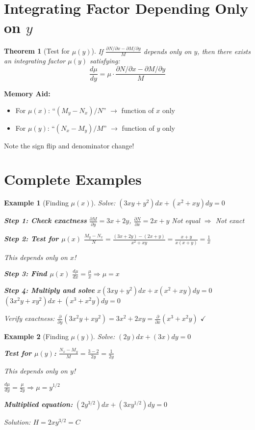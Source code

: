 \documentclass[12pt]{article}
\newtheorem{theorem}{Theorem}
\newtheorem{example}{Example}
\begin{document}
\section{Integrating Factor Depending Only on $y$}

\begin{theorem}[Test for $\mu(y)$]
If $\frac{\partial N/\partial x - \partial M/\partial y}{M}$ depends only on $y$, then there exists an integrating factor $\mu(y)$ satisfying:
$$\frac{d\mu}{dy} = \mu \cdot \frac{\partial N/\partial x - \partial M/\partial y}{M}$$
\end{theorem}

\begin{keypoint}
\textbf{Memory Aid:}
\begin{itemize}
    \item For $\mu(x)$: ``$(M_y - N_x)/N$'' $\to$ function of $x$ only
    \item For $\mu(y)$: ``$(N_x - M_y)/M$'' $\to$ function of $y$ only
\end{itemize}
Note the sign flip and denominator change!
\end{keypoint}

\section{Complete Examples}

\begin{example}[Finding $\mu(x)$]
Solve: $(3xy + y^2)dx + (x^2 + xy)dy = 0$

\textbf{Step 1: Check exactness}
$\frac{\partial M}{\partial y} = 3x + 2y$, $\frac{\partial N}{\partial x} = 2x + y$
Not equal $\Rightarrow$ Not exact

\textbf{Step 2: Test for $\mu(x)$}
$\frac{M_y - N_x}{N} = \frac{(3x + 2y) - (2x + y)}{x^2 + xy} = \frac{x + y}{x(x + y)} = \frac{1}{x}$

This depends only on $x$!

\textbf{Step 3: Find $\mu(x)$}
$\frac{d\mu}{dx} = \frac{\mu}{x} \Rightarrow \mu = x$

\textbf{Step 4: Multiply and solve}
$x(3xy + y^2)dx + x(x^2 + xy)dy = 0$
$(3x^2y + xy^2)dx + (x^3 + x^2y)dy = 0$

Verify exactness: $\frac{\partial}{\partial y}(3x^2y + xy^2) = 3x^2 + 2xy = \frac{\partial}{\partial x}(x^3 + x^2y)$ $\checkmark$
\end{example}

\begin{example}[Finding $\mu(y)$]
Solve: $(2y)dx + (3x)dy = 0$

\textbf{Test for $\mu(y)$:}
$\frac{N_x - M_y}{M} = \frac{3 - 2}{2y} = \frac{1}{2y}$

This depends only on $y$!

$\frac{d\mu}{dy} = \frac{\mu}{2y} \Rightarrow \mu = y^{1/2}$

\textbf{Multiplied equation:} $(2y^{3/2})dx + (3xy^{1/2})dy = 0$

Solution: $H = 2xy^{3/2} = C$
\end{example}
\end{document}
